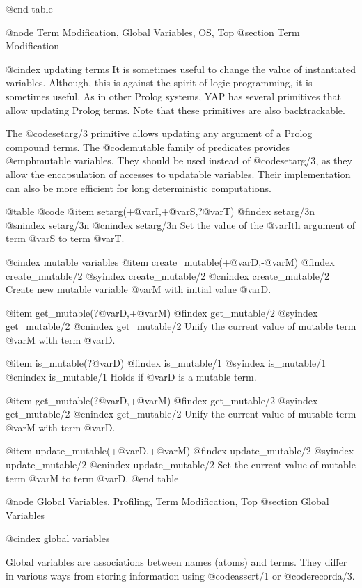 {{{{{@end table

@node Term Modification, Global Variables, OS, Top
@section Term Modification

@cindex updating terms
It is sometimes useful to change the value of instantiated
variables. Although, this is against the spirit of logic programming, it
is sometimes useful. As in other Prolog systems, YAP has
several primitives that allow updating Prolog terms. Note that these
primitives are also backtrackable.

The @code{setarg/3} primitive allows updating any argument of a Prolog
compound terms. The @code{mutable} family of predicates provides
@emph{mutable variables}. They should be used instead of @code{setarg/3},
as they allow the encapsulation of accesses to updatable
variables. Their implementation can also be more efficient for long
deterministic computations.

@table @code
@item setarg(+@var{I},+@var{S},?@var{T})
@findex setarg/3n
@snindex setarg/3n
@cnindex setarg/3n
Set the value of the @var{I}th argument of term @var{S} to term @var{T}. 

@cindex mutable variables
@item create_mutable(+@var{D},-@var{M})
@findex create_mutable/2
@syindex create_mutable/2
@cnindex create_mutable/2
Create new mutable variable @var{M} with initial value @var{D}.

@item get_mutable(?@var{D},+@var{M})
@findex get_mutable/2
@syindex get_mutable/2
@cnindex get_mutable/2
Unify the current value of mutable term @var{M} with term @var{D}.

@item is_mutable(?@var{D})
@findex is_mutable/1
@syindex is_mutable/1
@cnindex is_mutable/1
Holds if @var{D} is a mutable term.

@item get_mutable(?@var{D},+@var{M})
@findex get_mutable/2
@syindex get_mutable/2
@cnindex get_mutable/2
Unify the current value of mutable term @var{M} with term @var{D}.

@item update_mutable(+@var{D},+@var{M})
@findex update_mutable/2
@syindex update_mutable/2
@cnindex update_mutable/2
Set the current value of mutable term @var{M} to term @var{D}.
@end table

@node Global Variables, Profiling, Term Modification, Top
@section Global Variables

@cindex global variables

Global variables are associations between names (atoms) and
terms. They differ in various ways from storing information using
@code{assert/1} or @code{recorda/3}.

}}}}}
